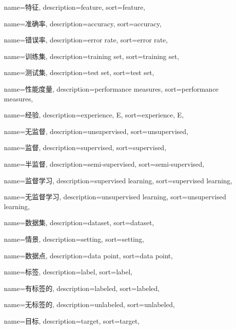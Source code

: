 {
  name=特征,
  description={feature},
  sort={feature},
}

{
  name=准确率,
  description={accuracy},
  sort={accuracy},
}

{
  name=错误率,
  description={error rate},
  sort={error rate},
}

{
  name=训练集,
  description={training set},
  sort={training set},
}

{
  name=测试集,
  description={test set},
  sort={test set},
}

{
  name=性能度量,
  description={performance measures},
  sort={performance measures},
}

{
  name=经验,
  description={experience, E},
  sort={experience, E},
}

{
  name=无监督,
  description={unsupervised},
  sort={unsupervised},
}

{
  name=监督,
  description={supervised},
  sort={supervised},
}

{
  name=半监督,
  description={semi-supervised},
  sort={semi-supervised},
}

{
  name=监督学习,
  description={supervised learning},
  sort={supervised learning},
}

{
  name=无监督学习,
  description={unsupervised learning},
  sort={unsupervised learning},
}

{
  name=数据集,
  description={dataset},
  sort={dataset},
}

{
	name=情景,
	description={setting},
	sort={setting},
}

{
  name=数据点,
  description={data point},
  sort={data point},
}

{
  name=标签,
  description={label},
  sort={label},
}

{
	name=有标签的,
	description={labeled},
	sort={labeled},
}

{
	name=无标签的,
	description={unlabeled},
	sort={unlabeled},
}


{
  name=目标,
  description={target},
  sort={target},
}

